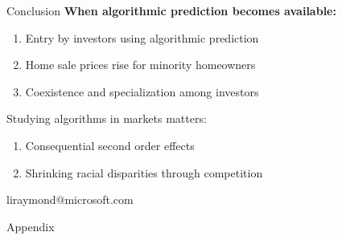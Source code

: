 \documentclass[aspectratio=169,t,11pt,table]{beamer}
\begin{document}
 
\begin{frame}{Conclusion}{}\label{conclusion}
  \textbf{When algorithmic prediction becomes available:}
  \begin{enumerate} \footnotesize
    \item Entry by investors using algorithmic prediction 
     \vspace{1mm} 
 \item Home sale prices rise for minority homeowners
 \vspace{1mm}
 \item Coexistence and specialization among investors
\end{enumerate}
\vspace{2mm}
\alert{Studying algorithms in markets matters:} 
\begin{enumerate}\footnotesize
    \item Consequential second order effects
    \vspace{1mm}
    \item Shrinking racial disparities through competition
\end{enumerate} 
   \vspace{2mm}
\textcolor{raspberry}{liraymond@microsoft.com} 
\end{frame} 


\appendix
\begin{frame}{Appendix}
  \thispagestyle{empty}
\end{frame}

\end{document}
